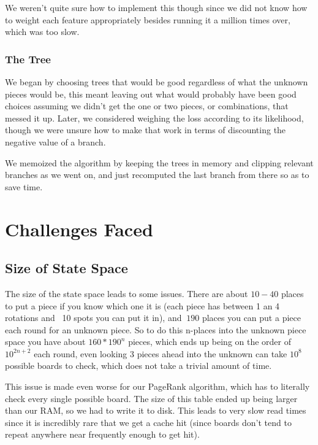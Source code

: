 \documentclass{article}
\begin{document}
\par We weren't quite sure how to implement this though since we did not know how to weight each feature appropriately besides running it a million times over, which was too slow.

\subsubsection{The Tree}

\par We began by choosing trees that would be good regardless of what the unknown pieces would be, this meant leaving out what would probably have been good choices assuming we didn't get the one or two pieces, or combinations, that messed it up. Later, we considered weighing the loss according to its likelihood, though we were unsure how to make that work in terms of discounting the negative value of a branch.

\par We memoized the algorithm by keeping the trees in memory and clipping relevant branches as we went on, and just recomputed the last branch from there so as to save time.

\section{Challenges Faced}
\label{sec:challenges_faced}

\subsection{Size of State Space}

\par The size of the state space leads to some issues. There are about $10-40$ places to put a piece if you know which one it is (each piece has between 1 an 4 rotations and ~10 spots you can put it in), and $~190$ places you can put a piece each round for an unknown piece. So to do this n-places into the unknown piece space you have about $160*190^n$ pieces, which ends up being on the order of $10^{2n + 2}$ each round, even looking 3 pieces ahead into the unknown can take $10^{8}$ possible boards to check, which does not take a trivial amount of time.

\par This issue is made even worse for our PageRank algorithm, which has to literally check every single possible board. The size of this table ended up being larger than our RAM, so we had to write it to disk. This leads to very slow read times since it is incredibly rare that we get a cache hit (since boards don't tend to repeat anywhere near frequently enough to get hit).
\end{document}
